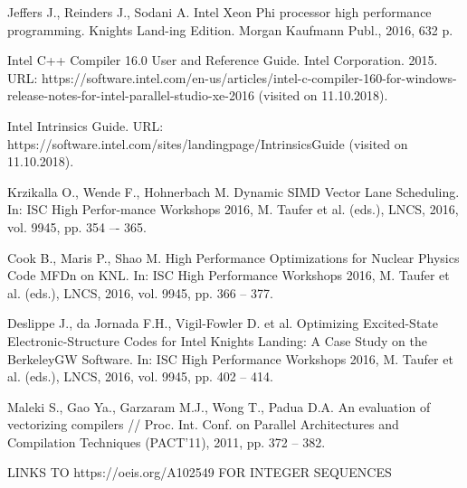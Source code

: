 \documentclass[
11pt,%
tightenlines,%
twoside,%
onecolumn,%
nofloats,%
nobibnotes,%
nofootinbib,%
superscriptaddress,%
noshowpacs,%
centertags]%
{revtex4}
\begin{document}
\begin{thebibliography}{99}
Jeffers J., Reinders J., Sodani A. Intel Xeon Phi processor high performance programming. Knights Land-ing Edition. Morgan Kaufmann Publ., 2016, 632 p.

Intel C++ Compiler 16.0 User and Reference Guide. Intel Corporation. 2015. URL: https://software.intel.com/en-us/articles/intel-c-compiler-160-for-windows-release-notes-for-intel-parallel-studio-xe-2016 (visited on 11.10.2018).

Intel Intrinsics Guide. URL: https://software.intel.com/sites/landingpage/IntrinsicsGuide (visited on 11.10.2018).

Krzikalla O., Wende F., Hohnerbach M. Dynamic SIMD Vector Lane Scheduling. In: ISC High Perfor-mance Workshops 2016, M. Taufer et al. (eds.), LNCS, 2016, vol. 9945, pp. 354 –- 365.

Cook B., Maris P., Shao M. High Performance Optimizations for Nuclear Physics Code MFDn on KNL. In: ISC High Performance Workshops 2016, M. Taufer et al. (eds.), LNCS, 2016, vol. 9945, pp. 366 -- 377.

Deslippe J., da Jornada F.H., Vigil-Fowler D. et al. Optimizing Excited-State Electronic-Structure Codes for Intel Knights Landing: A Case Study on the BerkeleyGW Software. In: ISC High Performance Workshops 2016, M. Taufer et al. (eds.), LNCS, 2016, vol. 9945, pp. 402 -- 414.

Maleki S., Gao Ya., Garzaram M.J., Wong T., Padua D.A. An evaluation of vectorizing compilers // Proc. Int. Conf. on Parallel Architectures and Compilation Techniques (PACT'11), 2011, pp. 372 -- 382.

LINKS TO https://oeis.org/A102549 FOR INTEGER SEQUENCES




\end{thebibliography}
\end{document}
